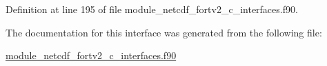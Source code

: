 Definition at line 195 of file module\+\_\+netcdf\+\_\+fortv2\+\_\+c\+\_\+interfaces.\+f90.



The documentation for this interface was generated from the following file\+:\begin{DoxyCompactItemize}
\item 
\hyperlink{module__netcdf__fortv2__c__interfaces_8f90}{module\+\_\+netcdf\+\_\+fortv2\+\_\+c\+\_\+interfaces.\+f90}\end{DoxyCompactItemize}
